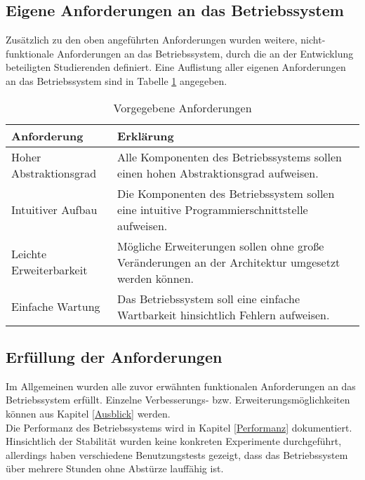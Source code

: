 \subsection{Eigene Anforderungen an das Betriebssystem}
Zusätzlich zu den oben angeführten Anforderungen wurden weitere, nicht-funktionale Anforderungen an das Betriebssystem, durch die an der Entwicklung beteiligten Studierenden definiert. Eine Auflistung aller eigenen Anforderungen an das Betriebssystem sind in Tabelle \ref{table:Own-Requirements} angegeben.

\begin{table}[H]
\begin{tabular}{ p{5cm}| p{9cm} }
  \textbf{Anforderung} & \textbf{Erklärung} \\ 
  \hline
  Hoher Abstraktionsgrad & Alle Komponenten des Betriebssystems sollen einen hohen Abstraktionsgrad aufweisen. \\
  Intuitiver Aufbau & Die Komponenten des Betriebssystem sollen eine intuitive Programmierschnittstelle aufweisen. \\
  Leichte Erweiterbarkeit & Mögliche Erweiterungen sollen ohne große Veränderungen an der Architektur umgesetzt werden können. \\
  Einfache Wartung & Das Betriebssystem soll eine einfache Wartbarkeit hinsichtlich Fehlern aufweisen. \\
 \end{tabular}
 \caption{Vorgegebene Anforderungen}
 \label{table:Own-Requirements}
\end{table}

\subsection{Erfüllung der Anforderungen}
Im Allgemeinen wurden alle zuvor erwähnten funktionalen Anforderungen an das Betriebssystem erfüllt. Einzelne Verbesserungs- bzw. Erweiterungsmöglichkeiten können aus Kapitel \ref{Ausblick} werden. \\
Die Performanz des Betriebssystems wird in Kapitel \ref{Performanz} dokumentiert.
Hinsichtlich der Stabilität wurden keine konkreten Experimente durchgeführt, allerdings haben verschiedene Benutzungstests gezeigt, dass das Betriebssystem über mehrere Stunden ohne Abstürze lauffähig ist.

\pagebreak 